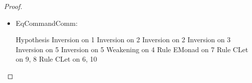 \begin{proof}
\begin{itemize}
\item EqCommandComm:
  \begin{eqnproof}
              {Hypothesis}
              {Inversion on 1}
              {Inversion on 2}
              {Inversion on 2}
              {Inversion on 3}
              {Inversion on 5}
              {Inversion on 5}
              {Weakening on 4}
              {Rule EMonad on 7}
               {Rule CLet on 9, 8}
               {Rule CLet on 6, 10}
  \end{eqnproof}


\end{itemize}
\end{proof}
